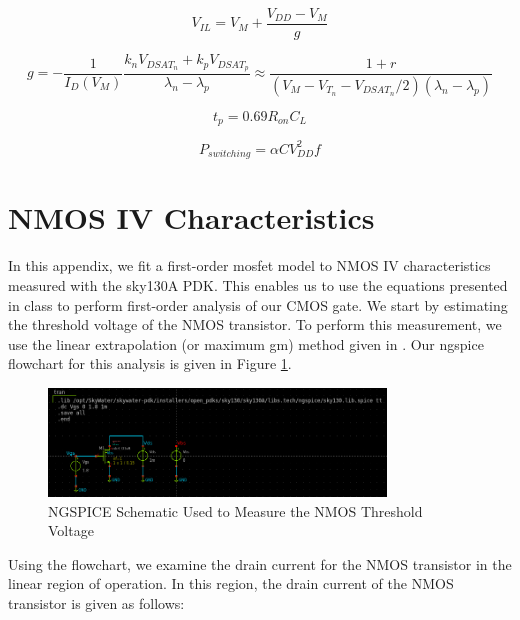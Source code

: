 \documentclass[fleqn]{article}
\begin{document}
	\begin{equation}
		V_{IL} = V_{M} + \frac{V_{DD} - V_M}{g}
	\end{equation}
	
	\begin{equation}
		g = -\frac{1}{I_D(V_M)}\frac{k_nV_{DSAT_n} + k_pV_{DSAT_p}}{\lambda_n - \lambda_p} \approx \frac{1 + r}{(V_M - V_{T_n} - V_{DSAT_n}/2)(\lambda_n - \lambda_p)}
	\end{equation}
	
	\begin{equation}
		t_p = 0.69R_{on}C_L
	\end{equation}
	
	\begin{equation}
		P_{switching} = {\alpha}CV_{DD}^2f
	\end{equation}
	
	
	
	\pagebreak
	\appendix
	\section{NMOS IV Characteristics}
	\label{appendix::nmos_iv_characteristics}
	
	In this appendix, we fit a first-order mosfet model to NMOS IV characteristics measured with the sky130A PDK. This enables us to use the equations presented in class to perform first-order analysis of our CMOS gate. We start by estimating the threshold voltage of the NMOS transistor. To perform this measurement, we use the linear extrapolation (or maximum gm) method given in \cite{cmos_vlsi_design}. Our ngspice flowchart for this analysis is given in Figure \ref{fig::nmos_vt_meas_schem}.
	
	\begin{figure}[H]
		\centerline{\includegraphics[width=0.8\textwidth]{nmos_vt_meas_schem.png}}
		\caption{NGSPICE Schematic Used to Measure the NMOS Threshold Voltage}
		\label{fig::nmos_vt_meas_schem}
	\end{figure}
	
	\noindent Using the flowchart, we examine the drain current for the NMOS transistor in the linear region of operation. In this region, the drain current of the NMOS transistor is given as follows:
	
\end{document}
